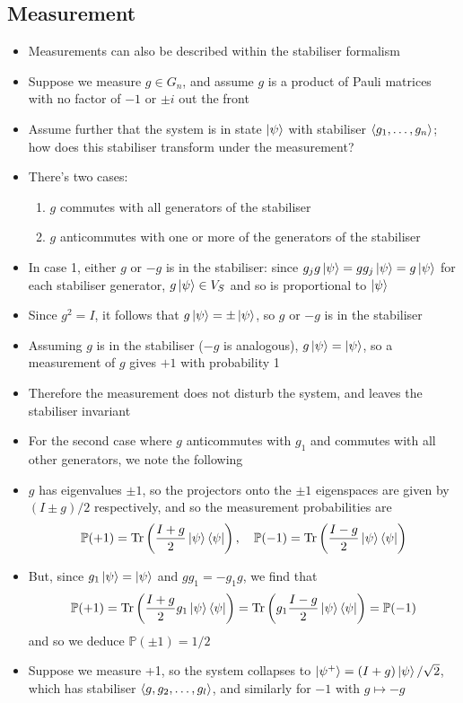 \documentclass[12pt,a4paper]{article}
\numberwithin{equation}{section}
\newcommand{\ketbra}[2]{\ket{#1}\bra{#2}}
\newcommand{\ketbras}[1]{\ketbra{#1}{#1}}
\begin{document}
	\subsection{Measurement}
	\begin{itemize}
		\item Measurements can also be described within the stabiliser formalism
		\item Suppose we measure $g\in G_{n}$, and assume $g$ is a product of Pauli matrices with no factor of $-1$ or $\pm i $ out the front
		\item Assume further that the system is in state $\ket{\psi}$ with stabiliser $\braket{g_{1},\ldots,g_{n}}$; how does this stabiliser transform under the measurement?
		\item There's two cases:
		\begin{enumerate}
			\item $g$ commutes with all generators of the stabiliser
			\item $g$ anticommutes with one or more of the generators of the stabiliser
		\end{enumerate}
		\item In case 1, either $g$ or $-g$ is in the stabiliser: since $g_{j}g\ket{\psi}=gg_{j}\ket{\psi}=g\ket{\psi}$ for each stabiliser generator, $g\ket{\psi}\in V_{S}$ and so is proportional to $\ket{\psi}$
		\item Since $g^{2}=I$, it follows that $g\ket{\psi}=\pm\ket{\psi}$, so $g$ or $-g$ is in the stabiliser
		\item Assuming $g$ is in the stabiliser ($-g$ is analogous), $g\ket{\psi}=\ket{\psi}$, so a measurement of $g$ gives $+1$ with probability 1
		\item Therefore the measurement does not disturb the system, and leaves the stabiliser invariant
		\item For the second case where $g$ anticommutes with $g_{1}$ and commutes with all other generators, we note the following
		\item $g$ has eigenvalues $\pm1$, so the projectors onto the $\pm1$ eigenspaces are given by $(I\pm g)/2$ respectively, and so the measurement probabilities are
		\begin{equation}
			\mathbb{P}(+1)=\text{Tr}\left(\frac{I+g}{2}\ketbras{\psi}\right),\quad\mathbb{P}(-1)=\text{Tr}\left(\frac{I-g}{2}\ketbras{\psi}\right)
		\end{equation}
		\item But, since $g_{1}\ket{\psi}=\ket{\psi}$ and $gg_{1}=-g_{1}g$, we find that
		\begin{equation}
			\mathbb{P}(+1)=\text{Tr}\left(\frac{I+g}{2}g_{1}\ketbras{\psi}\right)=\text{Tr}\left(g_{1}\frac{I-g}{2}\ketbras{\psi}\right)=\mathbb{P}(-1)
		\end{equation}
		and so we deduce $\mathbb{P}(\pm1)=1/2$
		\item Suppose we measure +1, so the system collapses to $\ket{\psi^{+}}=(I+g)\ket{\psi}/\sqrt{2}$, which has stabiliser $\braket{g,g_{2},\ldots,g_{l}}$, and similarly for $-1$ with $g\mapsto -g$
	\end{itemize}
\end{document}
